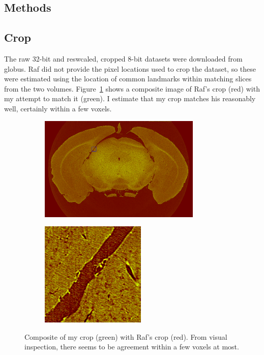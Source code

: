 \documentclass[11pt]{article}
\begin{document}
\subsection{Methods}
\subsection{Crop}
The raw 32-bit and reswcaled, cropped 8-bit datasets were downloaded from
globus. Raf did not provide the pixel locations used to crop the dataset, so
these were estimated using the location of common landmarks within matching
slices from the two volumes.  Figure~\ref{fig:composite} shows a composite image
of Raf's crop (red) with my attempt to match it (green). I estimate that my crop
matches his reasonably well, certainly within a few voxels.


\begin{figure}[h]
  \centering
  \begin{subfigure}[b]{0.48\textwidth}
    \centering
    \includegraphics[height=5cm]{figs/composite_labeled}    
  \end{subfigure}
  \hspace{1em}
  \begin{subfigure}[b]{0.48\textwidth}
    \centering
    \includegraphics[height=5cm]{figs/composite_insert}    
  \end{subfigure}
  \captionsetup{width=0.9\textwidth}
  \caption{Composite of my crop (green) with Raf's crop (red). From visual
    inspection, there seems to be agreement within a few voxels at most.}
  \label{fig:composite}
\end{figure}
\end{document}
